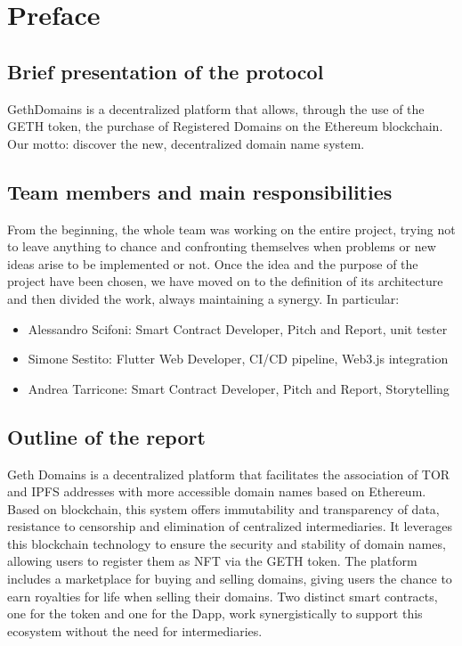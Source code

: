 \documentclass[main.tex]{subfiles}
\begin{document}
\section*{Preface}
\subsection*{Brief presentation of the protocol}
GethDomains is a decentralized platform that allows, through the use of the GETH token, the purchase of Registered Domains on the Ethereum blockchain.\\
Our motto: discover the new, decentralized domain name system.


\subsection*{Team members and main responsibilities}
From the beginning, the whole team was working on the entire project, trying not to leave anything to chance and confronting themselves when problems or new ideas arise to be implemented or not.
Once the idea and the purpose of the project have been chosen, we have moved on to the definition of its architecture and then divided the work, always maintaining a synergy.
In particular:
\begin{itemize}
    \item Alessandro Scifoni: Smart Contract Developer, Pitch and Report, unit tester
    \item Simone Sestito: Flutter Web Developer, CI/CD pipeline, Web3.js integration
    \item Andrea Tarricone: Smart Contract Developer, Pitch and Report, Storytelling
\end{itemize}

\subsection*{Outline of the report}
Geth Domains is a decentralized platform that facilitates the association of TOR and IPFS addresses with more accessible domain names based on Ethereum. 
Based on blockchain, this system offers immutability and transparency of data, resistance to censorship and elimination of centralized intermediaries.
It leverages this blockchain technology to ensure the security and stability of domain names, allowing users to register them as NFT via the GETH token.
The platform includes a marketplace for buying and selling domains, giving users the chance to earn royalties for life when selling their domains.
Two distinct smart contracts, one for the token and one for the Dapp, work synergistically to support this ecosystem without the need for intermediaries. 
\end{document}
